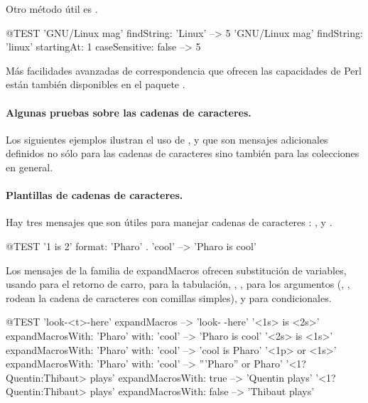 \documentclass[a4paper,10pt,twoside]{book}
\begin{document}
Otro m\'etodo \'util es .
\begin{code}{@TEST}
'GNU/Linux mag' findString: 'Linux'                                                      --> 5
'GNU/Linux mag' findString: 'linux' startingAt: 1 caseSensitive: false  --> 5
\end{code}

M\'as facilidades avanzadas de correspondencia que ofrecen las capacidades de Perl est\'an tambi\'en disponibles en el paquete .

\paragraph{Algunas pruebas sobre las cadenas de caracteres.} Los siguientes ejemplos ilustran el uso de \mbox{,}  y  que son mensajes adicionales definidos no s\'olo para las cadenas de caracteres sino tambi\'en para las colecciones en general.


\paragraph{Plantillas de cadenas de caracteres.}
Hay tres mensajes que son \'utiles para manejar cadenas de caracteres : ,  y .

\begin{code}{@TEST}
'{1} is {2}' format: {'Pharo' . 'cool'}  --> 'Pharo is cool'
\end{code}

Los mensajes de la familia de expandMacros ofrecen substituci\'on de variables, usando  para el retorno de carro,  para la tabulaci\'on, , ,  para los argumentos (, , rodean la cadena de caracteres con comillas simples), y  para condicionales.

\begin{code}{@TEST}
'look-<t>-here' expandMacros                                         --> 'look-	-here'
'<1s> is <2s>' expandMacrosWith: 'Pharo' with: 'cool'   --> 'Pharo is cool'
'<2s> is <1s>' expandMacrosWith: 'Pharo' with: 'cool'   --> 'cool is Pharo'
'<1p> or <1s>' expandMacrosWith: 'Pharo' with: 'cool'  --> '''Pharo'' or Pharo'
'<1?Quentin:Thibaut> plays' expandMacrosWith: true     --> 'Quentin plays'
'<1?Quentin:Thibaut> plays' expandMacrosWith: false    --> 'Thibaut plays'
\end{code}
\end{document}
